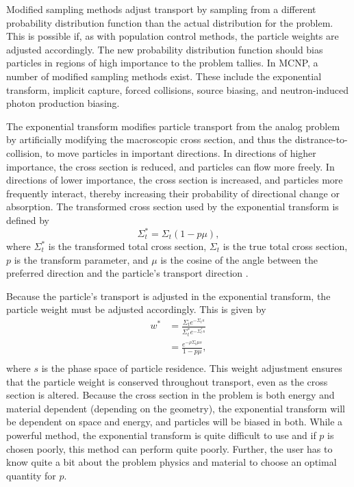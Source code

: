 Modified sampling methods adjust transport by sampling from a different probability
distribution function than the actual distribution for the problem. This is
possible if, as with population control methods, the particle weights are adjusted
 accordingly.
 The new probability distribution function should bias particles in regions of high
 importance to the problem tallies. In MCNP, a number of modified sampling
 methods exist.
 These include the exponential transform, implicit capture, forced collisions, source
 biasing, and neutron-induced photon production biasing.

The exponential transform modifies particle transport from the analog problem by
artificially modifying the macroscopic cross section, and thus the
distrance-to-collision, to move particles in important directions. In directions
of higher importance, the cross section is reduced, and particles can flow more
freely. In directions of lower importance, the cross section is increased, and
particles more frequently interact, thereby increasing their probability of
directional change or absorption. The transformed cross section used by the
exponential transform is defined by
%
\begin{equation*}
  \Sigma_t^* = \Sigma_t(1-p\mu) ,
\end{equation*}
%
where $\Sigma_t^*$ is the transformed total cross section, $\Sigma_t$ is the
true total cross section, $p$ is the transform parameter, and $\mu$ is the
cosine of the angle between the preferred direction and the particle's transport
direction \cite{mcnp_manual_v1, mcnp_manual_v2, hendricks_mcnp_1985}.

Because the particle's transport is adjusted in the exponential transform, the
particle weight must be adjusted accordingly. This is given by
%
\begin{equation*}
  \begin{split}
  w^* &= \frac{\Sigma_t e^{-\Sigma_t s}}{\Sigma_t^* e^{-\Sigma_t^* s}} \\
      &= \frac{e^{-\rho \Sigma_t \mu s}}{1-p\mu}, \\
  \end{split}
\end{equation*}
%
where $s$ is the phase space of particle residence. This weight adjustment
ensures that the particle weight is conserved throughout transport, even as
the cross section is altered. Because the cross section in the problem is both
energy and material dependent (depending on the geometry), the exponential
transform will be dependent on space and energy, and particles will be biased in
both. While a powerful method, the exponential transform is quite difficult to
use and if $p$ is chosen poorly, this method can perform quite poorly. Further,
the user has to know quite a bit about the problem physics and material to choose an
optimal quantity for $p$.

